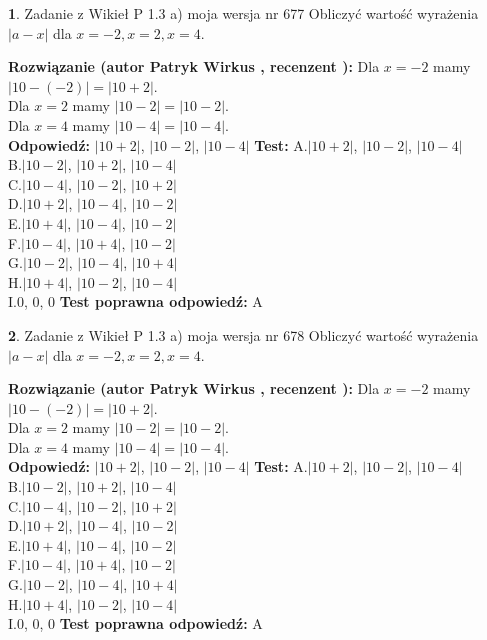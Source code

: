 \documentclass[12pt, a4paper]{article}
\theoremstyle{definition} %
\newtheorem{zad}{}
\newcommand{\zadStart}[1]{\begin{zad}#1\newline}
\newcommand{\zadStop}{\end{zad}}
\newcommand{\rozwStart}[2]{\noindent \textbf{Rozwiązanie (autor #1 , recenzent #2): }\newline}
\newcommand{\rozwStop}{\newline}
\newcommand{\odpStart}{\noindent \textbf{Odpowiedź:}\newline}
\newcommand{\odpStop}{\newline}
\newcommand{\testStart}{\noindent \textbf{Test:}\newline}
\newcommand{\testStop}{\newline}
\newcommand{\kluczStart}{\noindent \textbf{Test poprawna odpowiedź:}\newline}
\newcommand{\kluczStop}{\newline}
\begin{document}
\zadStart{Zadanie z Wikieł P 1.3 a) moja wersja nr 677}
Obliczyć wartość wyrażenia $|a - x|$ dla $x=-2,x=2,x=4$.
\zadStop
\rozwStart{Patryk Wirkus}{}
Dla $x = -2$ mamy $|10 - (-2)| = |10 + 2|$.\\
Dla $x = 2$ mamy $|10 - 2| = |10 - 2|$.\\
Dla $x = 4$ mamy $|10 - 4| = |10 - 4|$.\\
\rozwStop
\odpStart
$|10 + 2|$, $|10 - 2|$, $|10 - 4|$
\odpStop
\testStart
A.$|10 + 2|$, $|10 - 2|$, $|10 - 4|$\\
B.$|10 - 2|$, $|10 + 2|$, $|10 - 4|$\\
C.$|10 - 4|$, $|10 - 2|$, $|10 + 2|$\\
D.$|10 + 2|$, $|10 - 4|$, $|10 - 2|$\\
E.$|10 + 4|$, $|10 - 4|$, $|10 - 2|$\\
F.$|10 - 4|$, $|10 + 4|$, $|10 - 2|$\\
G.$|10 - 2|$, $|10 - 4|$, $|10 + 4|$\\
H.$|10 + 4|$, $|10 - 2|$, $|10 - 4|$\\
I.$0$, $0$, $0$
\testStop
\kluczStart
A
\kluczStop



\zadStart{Zadanie z Wikieł P 1.3 a) moja wersja nr 678}
Obliczyć wartość wyrażenia $|a - x|$ dla $x=-2,x=2,x=4$.
\zadStop
\rozwStart{Patryk Wirkus}{}
Dla $x = -2$ mamy $|10 - (-2)| = |10 + 2|$.\\
Dla $x = 2$ mamy $|10 - 2| = |10 - 2|$.\\
Dla $x = 4$ mamy $|10 - 4| = |10 - 4|$.\\
\rozwStop
\odpStart
$|10 + 2|$, $|10 - 2|$, $|10 - 4|$
\odpStop
\testStart
A.$|10 + 2|$, $|10 - 2|$, $|10 - 4|$\\
B.$|10 - 2|$, $|10 + 2|$, $|10 - 4|$\\
C.$|10 - 4|$, $|10 - 2|$, $|10 + 2|$\\
D.$|10 + 2|$, $|10 - 4|$, $|10 - 2|$\\
E.$|10 + 4|$, $|10 - 4|$, $|10 - 2|$\\
F.$|10 - 4|$, $|10 + 4|$, $|10 - 2|$\\
G.$|10 - 2|$, $|10 - 4|$, $|10 + 4|$\\
H.$|10 + 4|$, $|10 - 2|$, $|10 - 4|$\\
I.$0$, $0$, $0$
\testStop
\kluczStart
A
\kluczStop
\end{document}

